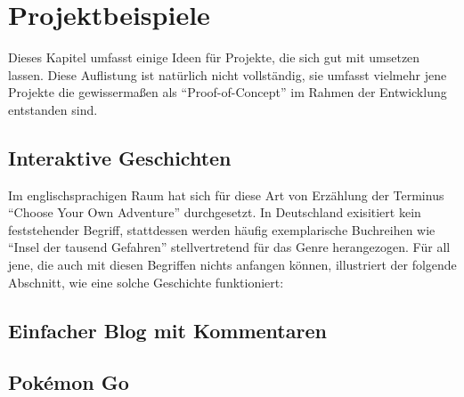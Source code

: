 \section{Projektbeispiele}
\label{sec:project-examples}

Dieses Kapitel umfasst einige Ideen für Projekte, die sich gut mit \textbf{\idename} umsetzen lassen. Diese Auflistung ist natürlich nicht vollständig, sie umfasst vielmehr jene Projekte die gewissermaßen als ``Proof-of-Concept'' im Rahmen der Entwicklung entstanden sind.


\subsection{Interaktive Geschichten}

Im englischsprachigen Raum hat sich für diese Art von Erzählung der Terminus ``Choose Your Own Adventure'' durchgesetzt. In Deutschland exisitiert kein feststehender Begriff, stattdessen werden häufig exemplarische Buchreihen wie ``Insel der tausend Gefahren'' stellvertretend für das Genre herangezogen. Für all jene, die auch mit diesen Begriffen nichts anfangen können, illustriert der folgende Abschnitt, wie eine solche Geschichte funktioniert:


\subsection{Einfacher Blog mit Kommentaren}

\subsection{Pokémon Go}

